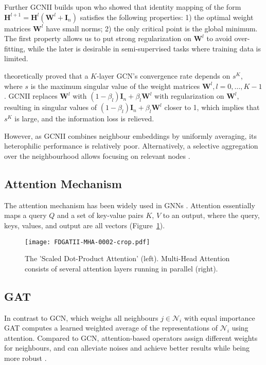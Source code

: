 \documentclass{article}
\begin{document}
Further GCNII builds upon \citet{hardt2016identity} who showed that identity mapping of the form $\mathbf{H}^{l+1}=\mathbf{H}^l(\mathbf{W}^l+\mathbf{I}_{n})$ satisfies the following properties: 1) the optimal weight matrices $\mathbf{W}^l$ have small norms; 2) the only critical point is the global minimum. The first property allows us to put strong regularization on $\mathbf{W}^l$ to avoid over-fitting, while the later is desirable in semi-supervised tasks where training data is limited. 

\citet{oono2019graph} theoretically proved that a $K$-layer GCN's convergence rate depends on $s^K$, where $s$ is the maximum singular value of the weight matrices $\mathbf{W}^l,l = 0,\ldots ,K-1$. GCNII replaces $\mathbf{W}^l$ with $(1-\beta_l)\mathbf{I}_{n}+\beta_l\mathbf{W}^l$ with regularization on $\mathbf{W}^l$, resulting in singular values of $(1-\beta_l)\mathbf{I}_{n}+\beta_l\mathbf{W}^l$ closer to 1, which implies that $s^{K}$ is large, and the information loss is relieved. 

However, as GCNII combines neighbour embeddings by uniformly averaging, its heterophilic performance is relatively poor. Alternatively, a selective aggregation over the neighbourhood allows focusing on relevant nodes \cite{zhu2020beyond}.

\subsection{Attention Mechanism}
The attention mechanism \cite{vaswani2017attention} has been widely used in GNNs \cite{chen2020simple,brody2021attentive, velivckovic2018graph}. Attention essentially maps a query $Q$ and a set of key-value pairs $K$, $V$ to an output, where the query, keys, values, and output are all vectors (Figure~\ref{fig_attention}).

\begin{figure}[h]
    \centering \texttt{[image: FDGATII-MHA-0002-crop.pdf]} 
    \caption{The \citet{vaswani2017attention} 'Scaled Dot-Product Attention' (left). Multi-Head Attention consists of several attention layers running in parallel (right).}
    \label{fig_attention}
\end{figure}

\subsection{GAT}
In contrast to GCN, which weighs all neighbours $j\in\mathcal{N}_i$ with equal importance GAT \cite{velivckovic2018graph} computes a learned weighted average of the representations of $\mathcal{N}_i$ using attention. Compared to GCN, attention-based operators assign different weights for neighbours, and can alleviate noises and achieve better results \cite{zhou2020graph} while being more robust \cite{alon2020bottleneck}. 
\end{document}
